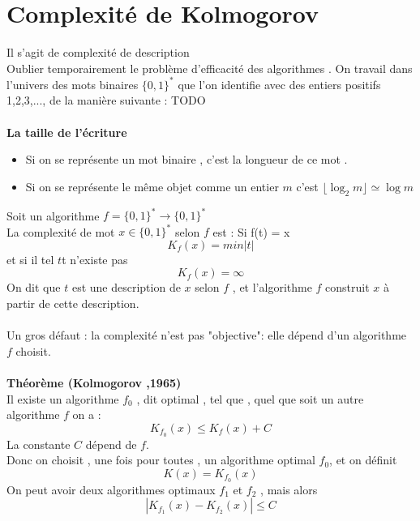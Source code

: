 \documentclass[base.tex]{subfiles}
\begin{document}
\section{Complexité de Kolmogorov}
Il s'agit de complexité de description\\
Oublier temporairement le problème d'efficacité des algorithmes . On travail dans l'univers des mots binaires $\{0,1\}^*$ que l'on identifie avec des entiers positifs 1,2,3,..., de la manière suivante :
TODO
\\
\\
\textbf{La taille de l'écriture }
\begin{itemize}
\item Si on se représente un mot binaire , c'est la longueur de ce mot .
  \item Si on se représente le même objet comme un entier $m$ c'est $\lfloor \log _2 m \rfloor\simeq \log m$
\end{itemize}
\medskip
Soit un algorithme $f=\{0,1\}^* \rightarrow \{0,1\}^*$ \\
La complexité de mot $x \in \{0,1\}^*$ selon $f$ est : %
Si f(t) = x
\[K_f(x)=min|t|\]
et si il tel $t$t n'existe pas 
\[K_f(x)=\infty\]
On dit que $t$ est une description de $x$ selon $f$ , et l'algorithme $f$ construit $x$ à partir de cette description.\\
\\
Un gros défaut : la complexité n'est pas "objective": elle dépend d'un algorithme $f$ choisit.\\
\\
\textbf{Théorème (Kolmogorov ,1965)}\\
Il existe un algorithme $f_0$ , dit optimal , tel que , quel que soit un autre algorithme $f$ on a :
\[K_{f_0}(x) \leq K_f(x) +C\]
La constante $C$ dépend de $f$.
\\
Donc on choisit , une fois pour toutes , un algorithme optimal $f_0$, et on définit
\[K(x) =K_{f_0}(x)\]
On peut avoir deux algorithmes optimaux $f_1$ et $f_2$ , mais alors
\[|K_{f_1}(x)-K_{f_2}(x)| \leq C\]
\end{document}
